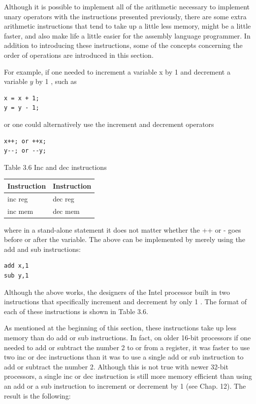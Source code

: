 \documentclass[10pt]{book}
\begin{document}
Although it is possible to implement all of the arithmetic necessary to implement unary operators with the instructions presented previously, there are some extra arithmetic instructions that tend to take up a little less memory, might be a little faster, and also make life a little easier for the assembly language programmer. In addition to introducing these instructions, some of the concepts concerning the order of operations are introduced in this section.

For example, if one needed to increment a variable x by 1 and decrement a variable $y$ by 1 , such as

\begin{verbatim}
x = x + 1;
y = y - 1;
\end{verbatim}

or one could alternatively use the increment and decrement operators

\begin{verbatim}
x++; or ++x;
y--; or --y;
\end{verbatim}

Table 3.6 Inc and dec instructions

\begin{center}
\begin{tabular}{|l|l|}
\hline
Instruction & Instruction \\
\hline
inc reg & dec reg \\
\hline
inc mem & dec mem \\
\hline
\end{tabular}
\end{center}

where in a stand-alone statement it does not matter whether the ++ or - goes before or after the variable. The above can be implemented by merely using the add and sub instructions:

\begin{verbatim}
add x,1
sub y,1
\end{verbatim}

Although the above works, the designers of the Intel processor built in two instructions that specifically increment and decrement by only 1 . The format of each of these instructions is shown in Table 3.6.

As mentioned at the beginning of this section, these instructions take up less memory than do add or sub instructions. In fact, on older 16-bit processors if one needed to add or subtract the number 2 to or from a register, it was faster to use two inc or dec instructions than it was to use a single add or sub instruction to add or subtract the number 2. Although this is not true with newer 32-bit processors, a single inc or dec instruction is still more memory efficient than using an add or a sub instruction to increment or decrement by 1 (see Chap. 12). The result is the following:
\end{document}
